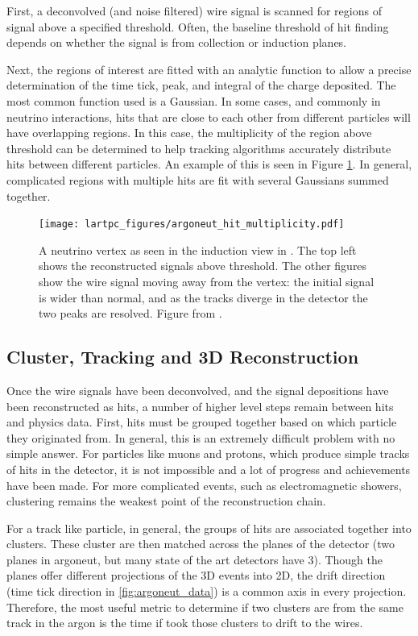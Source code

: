 First, a deconvolved (and noise filtered) wire signal is scanned for regions of signal above a specified threshold.  Often, the baseline threshold of hit finding depends on whether the signal is from collection or induction planes.

Next, the regions of interest are fitted with an analytic function to allow a precise determination of the time tick, peak, and integral of the charge deposited.  The most common function used is a Gaussian.  In some cases, and commonly in neutrino interactions, hits that are close to each other from different particles will have overlapping regions.  In this case, the multiplicity of the region above threshold can be determined to help tracking algorithms accurately distribute hits between different particles.  An example of this is seen in Figure \ref{fig:argoneut_hit_multiplicity}.  In general, complicated regions with multiple hits are fit with several Gaussians summed together.

\begin{figure}[h]
  \centering
  \texttt{[image: lartpc\_figures/argoneut\_hit\_multiplicity.pdf]}
  \caption{A neutrino vertex as seen in the induction view in \argoneut.  The top left shows the reconstructed signals above threshold.  The other figures show the wire signal moving away from the vertex: the initial signal is wider than normal, and as the tracks diverge in the detector the two peaks are resolved.  Figure from \cite{Anderson:2012vc}.}
  \label{fig:argoneut_hit_multiplicity}
\end{figure}

\subsection{Cluster, Tracking and 3D Reconstruction}

Once the wire signals have been deconvolved, and the signal depositions have been reconstructed as hits, a number of higher level steps remain between hits and physics data.  First, hits must be grouped together based on which particle they originated from.  In general, this is an extremely difficult problem with no simple answer.  For particles like muons and protons, which produce simple tracks of hits in the detector, it is not impossible and a lot of progress and achievements have been made.  For more complicated events, such as electromagnetic showers, clustering remains the weakest point of the reconstruction chain.

For a track like particle, in general, the groups of hits are associated together into clusters.  These cluster are then matched across the planes of the detector (two planes in argoneut, but many state of the art detectors have 3).  Though the planes offer different projections of the 3D events into 2D, the drift direction (time tick direction in \ref{fig:argoneut_data}) is a common axis in every projection.  Therefore, the most useful metric to determine if two clusters are from the same track in the argon is the time if took those clusters to drift to the wires.

